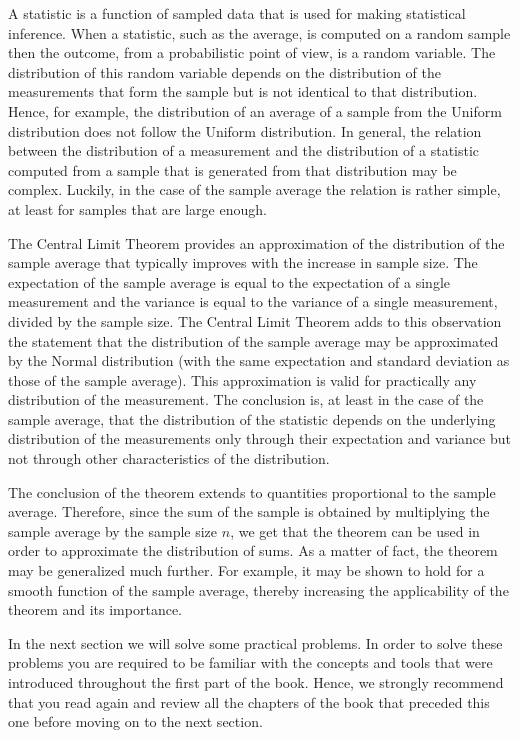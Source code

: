 \documentclass[
]{krantz}
\theoremstyle{definition}
\theoremstyle{definition}
\theoremstyle{definition}
\theoremstyle{remark}
\begin{document}
A statistic is a function of sampled data that is used for making
statistical inference. When a statistic, such as the average, is
computed on a random sample then the outcome, from a probabilistic point
of view, is a random variable. The distribution of this random variable
depends on the distribution of the measurements that form the sample but
is not identical to that distribution. Hence, for example, the
distribution of an average of a sample from the Uniform distribution
does not follow the Uniform distribution. In general, the relation
between the distribution of a measurement and the distribution of a
statistic computed from a sample that is generated from that
distribution may be complex. Luckily, in the case of the sample average
the relation is rather simple, at least for samples that are large
enough.

The Central Limit Theorem provides an approximation of the distribution
of the sample average that typically improves with the increase in
sample size. The expectation of the sample average is equal to the
expectation of a single measurement and the variance is equal to the
variance of a single measurement, divided by the sample size. The
Central Limit Theorem adds to this observation the statement that the
distribution of the sample average may be approximated by the Normal
distribution (with the same expectation and standard deviation as those
of the sample average). This approximation is valid for practically any
distribution of the measurement. The conclusion is, at least in the case
of the sample average, that the distribution of the statistic depends on
the underlying distribution of the measurements only through their
expectation and variance but not through other characteristics of the
distribution.

The conclusion of the theorem extends to quantities proportional to the
sample average. Therefore, since the sum of the sample is obtained by
multiplying the sample average by the sample size \(n\), we get that the
theorem can be used in order to approximate the distribution of sums. As
a matter of fact, the theorem may be generalized much further. For
example, it may be shown to hold for a smooth function of the sample
average, thereby increasing the applicability of the theorem and its
importance.

In the next section we will solve some practical problems. In order to
solve these problems you are required to be familiar with the concepts
and tools that were introduced throughout the first part of the book.
Hence, we strongly recommend that you read again and review all the
chapters of the book that preceded this one before moving on to the next
section.
\end{document}
